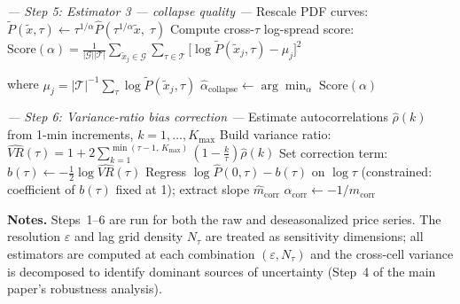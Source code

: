 \documentclass[12pt,a4paper]{article}
\newcommand{\alphah}{\hat{\alpha}}
\newcommand{\Ph}{\hat{P}}
\newcommand{\rhoh}{\hat{\rho}}
\newcommand{\VRh}{\widehat{VR}}
\begin{document}
\begin{algorithm}[H]
\begin{algorithmic}[1]
\Statex
\Statex \textit{--- Step 5: Estimator 3 — collapse quality ---}
  \State Rescale PDF curves:
         $\tilde{P}(\tilde{x},\tau) \leftarrow \tau^{1/\alpha}\Ph\!\left(\tau^{1/\alpha}\tilde{x},\;\tau\right)$
  \State Compute cross-$\tau$ log-spread score:
         $\displaystyle\mathrm{Score}(\alpha)
          = \frac{1}{|\mathcal{G}||\mathcal{T}|}
            \sum_{\tilde{x}_j\in\mathcal{G}}\sum_{\tau\in\mathcal{T}}
            \!\bigl[\log\tilde{P}(\tilde{x}_j,\tau)-\mu_j\bigr]^2$
         \par\hfill where $\mu_j = |\mathcal{T}|^{-1}\sum_\tau\log\tilde{P}(\tilde{x}_j,\tau)$
\EndFor
\State $\alphah_{\mathrm{collapse}} \leftarrow \arg\min_\alpha\;\mathrm{Score}(\alpha)$

\Statex
\Statex \textit{--- Step 6: Variance-ratio bias correction ---}
\State Estimate autocorrelations $\rhoh(k)$ from 1-min increments,
       $k=1,\ldots,K_{\max}$
\State Build variance ratio:
       $\displaystyle\VRh(\tau)
        = 1 + 2\sum_{k=1}^{\min(\tau-1,\,K_{\max})}
          \!\left(1 - \frac{k}{\tau}\right)\rhoh(k)$
\State Set correction term: $b(\tau) \leftarrow -\tfrac{1}{2}\log\VRh(\tau)$
\State Regress $\log\Ph(0,\tau) - b(\tau)$ on $\log\tau$ (constrained: coefficient
       of $b(\tau)$ fixed at 1); extract slope $\hat{m}_{\mathrm{corr}}$
\State $\alphah_{\mathrm{corr}} \leftarrow -1/\hat{m}_{\mathrm{corr}}$
       \hfill{}

\end{algorithmic}
\end{algorithm}

\bigskip
\noindent\textbf{Notes.}
Steps~1--6 are run for both the raw and deseasonalized price series.
The resolution $\varepsilon$ and lag grid density $N_\tau$ are treated as
sensitivity dimensions; all estimators are computed at each combination
$(\varepsilon, N_\tau)$ and the cross-cell variance is decomposed to identify
dominant sources of uncertainty (Step~4 of the main paper's robustness analysis).
\end{document}
